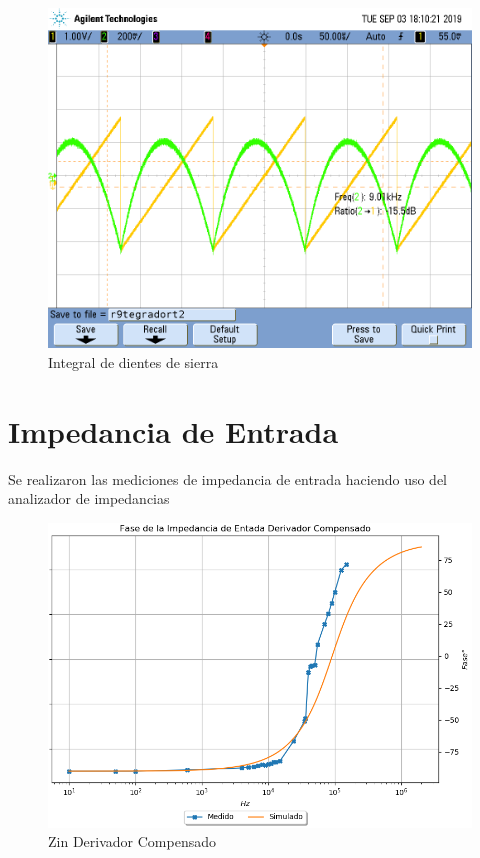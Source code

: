 \begin{figure}[H]
	\centering
	\includegraphics[width=\textwidth]{Ejercicio4/FOTOS-TP2-TC-EJ4/r9tegradort2} 
	\caption{Integral de dientes de sierra}
\end{figure}

\section{Impedancia de Entrada}
Se realizaron las mediciones de impedancia de entrada haciendo uso del analizador de impedancias

\begin{figure}[H]
	\centering
	\includegraphics[width=\textwidth]{Ejercicio4/SUPERPOSICION-ZIN-DERIVADOR-COMPENSADO-FASE} 
	\caption{Zin Derivador Compensado}
\end{figure}

